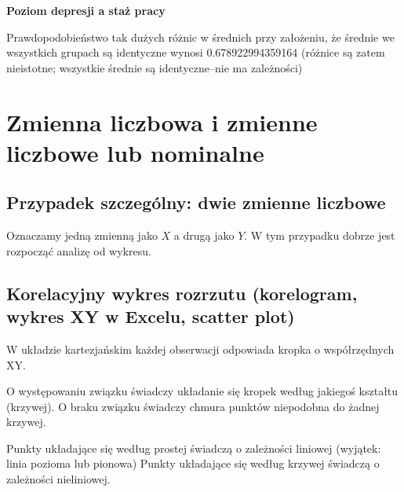 \documentclass[
  openany]{book}
\begin{document}
\begin{example}
\textbf{Poziom depresji a staż pracy}

Prawdopodobieństwo tak dużych różnic w średnich
przy założeniu, że średnie we wszystkich grupach są identyczne wynosi
0.678922994359164 (różnice są zatem nieistotne;
wszystkie średnie są identyczne--nie ma zależności)
\end{example}

\hypertarget{zmienna-liczbowa-i-zmienne-liczbowe-lub-nominalne}{%
\section{Zmienna liczbowa i zmienne liczbowe lub nominalne}\label{zmienna-liczbowa-i-zmienne-liczbowe-lub-nominalne}}

\hypertarget{przypadek-szczeguxf3lny-dwie-zmienne-liczbowe}{%
\subsection{Przypadek szczególny: dwie zmienne liczbowe}\label{przypadek-szczeguxf3lny-dwie-zmienne-liczbowe}}

Oznaczamy jedną zmienną jako \(X\) a drugą jako \(Y\).
W tym przypadku dobrze jest rozpocząć analizę od wykresu.

\hypertarget{korelacyjny-wykres-rozrzutu-korelogram-wykres-xy-w-excelu-scatter-plot}{%
\subsection{Korelacyjny wykres rozrzutu (korelogram, wykres XY w Excelu, scatter plot)}\label{korelacyjny-wykres-rozrzutu-korelogram-wykres-xy-w-excelu-scatter-plot}}

W układzie kartezjańskim każdej obserwacji odpowiada
kropka o współrzędnych XY.

O występowaniu związku świadczy układanie się kropek według jakiegoś
kształtu (krzywej). O braku związku
świadczy chmura punktów niepodobna do żadnej krzywej.

Punkty układające się według prostej świadczą o zależności liniowej
(wyjątek: linia pozioma lub pionowa)
Punkty układające się według krzywej świadczą
o zależności nieliniowej.
\end{document}
